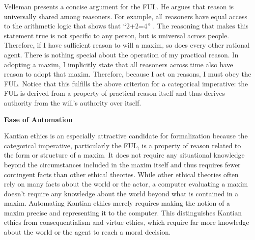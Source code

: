 \begin{isabellebody}
\begin{isamarkuptext}
Velleman presents a concise argument for the FUL. He argues that reason is universally shared among reasoners. For 
example, all reasoners have equal access to the arithmetic logic that shows that ``2+2=4'' \cite[29]{velleman}. The 
reasoning that makes this statement true is not specific to any person, but is universal across people. 
Therefore, if I have sufficient reason to will a maxim, so does every other rational agent. There is 
nothing special about the operation of my practical reason. 
In adopting a maxim, I implicitly state that all reasoners
across time also have reason to adopt that maxim. Therefore, because I act on reasons, I must obey the 
FUL. Notice that this fulfills the above criterion for a categorical imperative: the FUL is derived from 
a property of practical reason itself and thus derives authority from the will's authority over itself.%
\end{isamarkuptext}\isamarkuptrue%
%
\begin{isamarkuptext}%
\noindent \textbf{Ease of Automation}%
\end{isamarkuptext}\isamarkuptrue%
%
\begin{isamarkuptext}%
Kantian ethics is an especially attractive candidate for formalization because the categorical imperative, particularly the FUL, 
is a property of reason related to the form or structure of a maxim. It does not require any situational 
knowledge beyond the circumstances included
in the maxim itself and thus requires fewer contingent facts than other ethical theories.
While other ethical theories often rely on many facts about 
the world or the actor, a computer evaluating 
a maxim doesn't require any knowledge about the world beyond what is contained in a maxim. Automating 
Kantian ethics merely requires making the notion of a maxim precise and representing it to the computer. 
This distinguishes Kantian ethics from consequentialism and virtue ethics, which
require far more knowledge about the world or the agent to reach a moral decision.


\end{isamarkuptext}
\end{isabellebody}
